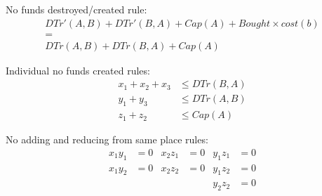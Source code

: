 No funds destroyed/created rule:
\begin{gather*}
  DTr'(A,B) + DTr'(B,A) + Cap(A) + Bought \times cost(b) \\ = \\
  DTr(A,B) + DTr(B,A) + Cap(A)
\end{gather*}

Individual no funds created rules:
\begin{align*}
  x_1 + x_2 + x_3 & \leq DTr(B,A) \\
  y_1 + y_3 & \leq DTr(A,B) \\
  z_1 + z_2 & \leq Cap(A)
\end{align*}

No adding and reducing from same place rules:
\begin{align*}
  x_1y_1 &= 0 & x_2z_1 &= 0 & y_1z_1 &= 0 \\
  x_1y_2 &= 0 & x_2z_2 &= 0 & y_1z_2 &= 0 \\
          &   &         &   & y_2z_2 &= 0
\end{align*}
